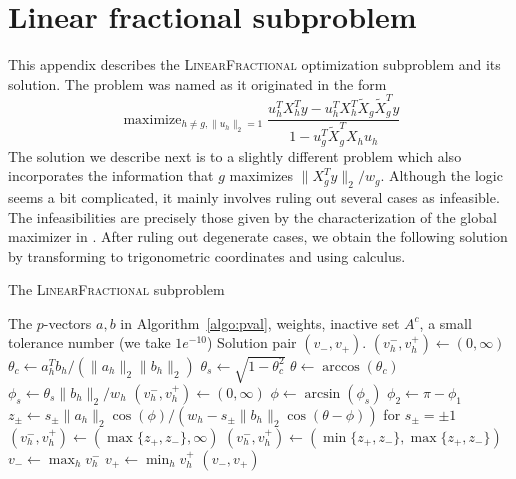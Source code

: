 \documentclass{imsart}
\newcommand{\maximize}{\mathop{\mathrm{maximize}}}
\newcommand{\norm}[1]{\lVert #1 \rVert}
\begin{document}
\newpage


%


\newpage

\appendix
\section{Linear fractional subproblem}
\label{app:closedform}

This appendix describes the \textsc{LinearFractional} optimization
subproblem and its solution.
The problem was named as it originated in the form
\[
\maximize_{h \neq g, \norm{u_h}_2 = 1}
\frac{u_h^TX_h^Ty - u_h^TX_h^T\tilde X_g \tilde X_g^Ty}
{1 - u_g^T \tilde X_g^TX_hu_h}
\]
The solution we describe next is to a slightly different problem which
also incorporates the information that $g$ maximizes $\norm{X_g^Ty}_2/w_g$.
Although the logic seems a bit complicated, it mainly involves ruling out
several cases as infeasible. The infeasibilities are precisely those given
by the characterization of the global maximizer in \cite{tests:adaptive}.
After ruling out degenerate cases, we obtain the following solution
by transforming to trigonometric coordinates and using calculus.

\begin{algorithm}
 \caption{The \textsc{LinearFractional} subproblem}
 \label{algo:linfrac}
 \begin{algorithmic}
   \REQUIRE The $p$-vectors $a, b$ in Algorithm~\ref{algo:pval}, weights, inactive set $A^c$, a small tolerance number
(we take $1e^{-10}$)
   \ENSURE Solution pair $(v_-, v_+)$.
     \IF{$\norm{b_h}_2 == 0$ or $\norm{a_h}_2/\norm{b_h}_2 < \text{tol}$}
       \STATE $(v^-_h, v^+_h) \gets (0, \infty)$
     \ELSE
       \STATE $\theta_c \gets a_h^Tb_h/(\norm{a_h}_2 \norm{b_h}_2)$
       \STATE $\theta_s \gets \sqrt{1-\theta_c^2}$
       \STATE $\theta \gets \arccos (\theta_c)$
       \STATE $\phi_s \gets \theta_s \norm{b_h}_2 / w_h$
         \STATE $(v^-_h, v^+_h) \gets (0, \infty)$
       \ELSE
         \STATE $\phi \gets \arcsin(\phi_s)$
         \STATE $\phi_2 \gets \pi - \phi_1$
         \STATE $z_\pm \gets s_\pm \norm{a_h}_2 \cos(\phi) /(w_h - s_\pm \norm{b_h}_2 \cos(\theta - \phi))$ for $s_\pm = \pm 1$
         \IF{$\norm{b_h}_2 < w_h$}
           \STATE $(v_h^-, v_h^+) \gets (\max \{ z_+, z_- \}, \infty)$
         \ELSE
           \STATE $(v_h^-, v_h^+) \gets (\min \{ z_+, z_- \}, \max \{ z_+, z_- \})$
         \ENDIF
       \ENDIF
     \ENDIF
   \ENDFOR
   \STATE $v_- \gets \max_h v_h^-$
   \STATE $v_+ \gets \min_h v_h^+$
   \RETURN $(v_-, v_+)$
 \end{algorithmic}
\end{algorithm}
\end{document}
